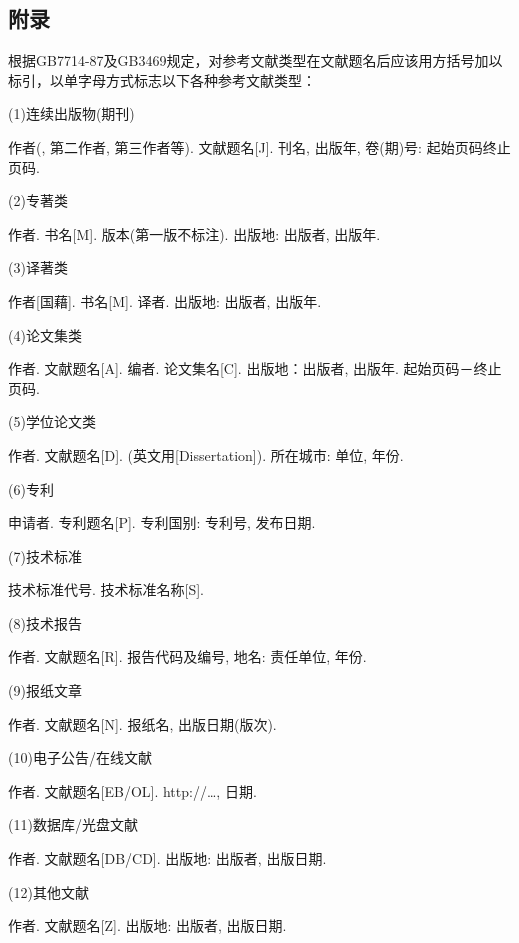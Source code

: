 \documentclass[a4paper]{article}
\begin{document}
	\subsection{附录}
	\begin{body}
		根据GB7714-87及GB3469规定，对参考文献类型在文献题名后应该用方括号加以标引，以单字母方式标志以下各种参考文献类型：\par
		(1)连续出版物(期刊)\par
		[序号] 作者(, 第二作者, 第三作者等). 文献题名[J]. 刊名, 出版年, 卷(期)号: 起始页码{\stilde}终止页码.\par
		(2)专著类\par
		[序号] 作者. 书名[M]. 版本(第一版不标注). 出版地: 出版者, 出版年.\par
		(3)译著类\par
		[序号] 作者[国藉]. 书名[M]. 译者. 出版地: 出版者, 出版年.\par
		(4)论文集类\par
		[序号] 作者. 文献题名[A]. 编者. 论文集名[C]. 出版地：出版者, 出版年. 起始页码－终止页码.\par
		(5)学位论文类\par
		[序号] 作者. 文献题名[D]. (英文用[Dissertation]). 所在城市: 单位, 年份.\par
		(6)专利\par
		[序号] 申请者. 专利题名[P]. 专利国别: 专利号, 发布日期.\par
		(7)技术标准\par
		[序号] 技术标准代号. 技术标准名称[S].\par
		(8)技术报告\par
		[序号] 作者. 文献题名[R]. 报告代码及编号, 地名: 责任单位, 年份.\par
		(9)报纸文章\par
		[序号] 作者. 文献题名[N]. 报纸名, 出版日期(版次).\par
		(10)电子公告\slash{}在线文献\par
		[序号] 作者. 文献题名[EB/OL]. http:{\slash\slash}…, 日期.\par
		(11)数据库\slash{}光盘文献\par
		[序号] 作者. 文献题名[DB\slash{}CD]. 出版地: 出版者, 出版日期.\par
		(12)其他文献\par
		[序号] 作者. 文献题名[Z]. 出版地: 出版者, 出版日期.\par
	\end{body}
\end{document}
